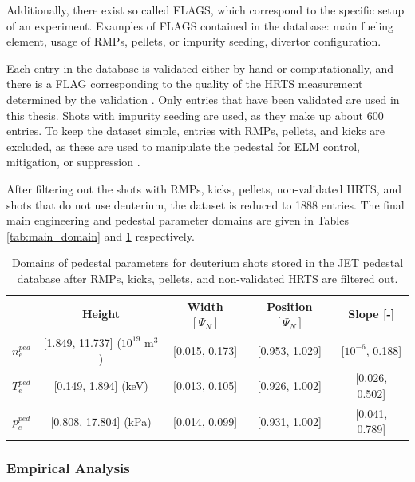 \documentclass[a4paper, twoside, final, 12pt]{article}
\begin{document}
Additionally, there exist so called FLAGS, which correspond to the specific setup of an experiment.
Examples of FLAGS contained in the database: main fueling element, usage of RMPs, pellets, or impurity seeding, divertor configuration. 

Each entry in the database is validated either by hand or computationally, and there is a FLAG corresponding to the quality of the HRTS measurement determined by the validation \cite{Frassinetti_2020}.
Only entries that have been validated are used in this thesis.
Shots with impurity seeding are used, as they make up about 600 entries.
To keep the dataset simple, entries with RMPs, pellets, and kicks are excluded, as these are used to manipulate the pedestal for ELM control, mitigation, or suppression \cite{Viezzer_2018}.

After filtering out the shots with RMPs, kicks, pellets, non-validated HRTS, and shots that do not use deuterium, the dataset is reduced to 1888 entries. The final main engineering and pedestal parameter domains are given in Tables \ref{tab:main_domain} and \ref{tab:ped_quant} respectively.
\begin{center}
\begin{table}[h]
\begin{tabular}{ | c | c | c | c | c | }
	\hline 
	& Height & Width $[\Psi_N]$ & Position $[\Psi_N]$ & Slope [-] \\ 
	\hline
	$n_e^{ped}$ &[1.849, 11.737] ($10^{19}$ m$^3$) & [0.015, 0.173]& [0.953, 1.029] & [$10^{-6}$, 0.188] \\
	$T_e^{ped}$ & [0.149, 1.894] (keV)& [0.013, 0.105] & [0.926, 1.002] & [0.026, 0.502] \\
	$p_e^{ped}$ & [0.808, 17.804] (kPa)& [0.014, 0.099] & [0.931, 1.002]& [0.041, 0.789] \\
	\hline
\end{tabular}
\caption{Domains of pedestal parameters for deuterium shots stored in the JET pedestal database after RMPs, kicks, pellets, and non-validated HRTS are filtered out.}
\label{tab:ped_quant}
\end{table}
\end{center}


\subsubsection{Empirical Analysis}
\end{document}
